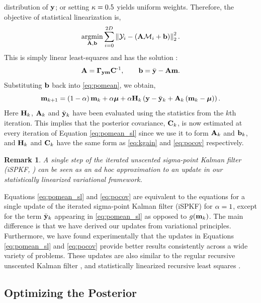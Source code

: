 \documentclass{article} %
\newtheorem{remark}{Remark}
\begin{document}
distribution of $\obs$; or setting $\scoef = 0.5$ yields uniform weights.
Therefore, the objective of statistical linearization is,
\begin{equation}
    \argmin_{\Linmat, \intcpt} \sum^{2D}_{i=0} 
        \lnorm{2}{\Sobs_i - \brac{\Linmat\Sfunc_i + \intcpt}}^2.
\end{equation}
This is simply linear least-squares and has the solution \cite{Geist2010}:
\begin{equation}
    \Linmat = \xcov \pocov\inv, \qquad
    \intcpt = \bar\obs - \Linmat\pomean.
\end{equation}
Substituting $\intcpt$ back into \eqref{eq:pomean}, we obtain, 
\begin{equation}
    \pomean_{k+1} = \brac{1-\step}\pomean_k + \step\prmean 
        + \step\Kgain_k\brac{\obs - \bar\obs_k 
        + \Linmat_k\brac{\pomean_k - \prmean}}.
    \label{eq:pomean_sl}
\end{equation}
Here $\Kgain_k$, $\Linmat_k$ and $\bar\obs_k$ have been evaluated using the
statistics from the $k$th iteration. This implies that the posterior
covariance, $\pocov_k$, is now estimated at every iteration of Equation
\eqref{eq:pomean_sl} since we use it to form $\Linmat_k$ and $\intcpt_k$, and 
$\Kgain_k$ and $\pocov_k$ have the same form as \eqref{eq:kgain} and
\eqref{eq:pocov} respectively. 
%
\begin{remark}
A single step of the  iterated unscented sigma-point Kalman filter (iSPKF,
\cite{Sibley2006}) can be seen as an ad hoc approximation to an update in our
statistically linearized variational framework. 
\end{remark}

Equations \eqref{eq:pomean_sl} and \eqref{eq:pocov} are equivalent to the
equations for a single update of the iterated sigma-point Kalman filter (iSPKF)
for $\step = 1$, except for the term $\bar\obs_k$ appearing in
\eqref{eq:pomean_sl} as opposed to $\nonlin{\pomean_k}$. The main difference is
that we have derived our updates from  variational principles.  Furthermore, we
have found experimentally that the updates in Equations \eqref{eq:pomean_sl}
and \eqref{eq:pocov} provide better results consistently across a wide variety
of problems.
%
These updates  are also similar to the regular recursive unscented Kalman
filter \cite{Julier2004}, and statistically linearized recursive least squares
\cite{Geist2010}.


\subsection{Optimizing the Posterior}
\end{document}
